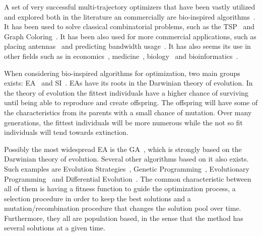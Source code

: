 A set of very successful multi-trajectory optimizers that have been vastly
utilized and explored both in the literature an commercially are bio-inspired
algorithms~\cite{olariu2005handbook}. It has been used to solve classical
combinatorial problems, such as the
\ac{TSP}~\cite{chatterjee1996genetic} and Graph Coloring~\cite{costa1995embedding}.
It has been also used for more commercial applications, such as placing
antennas~\cite{calegari1997parallel} and predicting bandwidth
usage~\cite{swaminathan1999bandwidth}. It has also seems its use in other fields
such as in economics~\cite{li1996economic}, medicine~\cite{wehrens1993hips},
biology~\cite{cotta2002inferring} and bioinformatics~\cite{cotta2009metaheuristics}.

When considering bio-inspired algorithms for optimization, two main groups
exists: \ac{EA}~\cite{back1996evolutionary} and
\ac{SI}~\cite{mavrovouniotis2017survey}. \ac{EA}s have its roots in the
Darwinian theory of evolution. In the theory of evolution the fittest
individuals have a higher chance of surviving until being able to reproduce and
create offspring. The offspring will have some of the characteristics from its
parents with a small chance of mutation. Over many
generations, the fittest individuals will be more numerous while the not so fit
individuals will tend towards extinction.

Possibly the most widespread \ac{EA} is the \ac{GA}~\cite{holland1992genetic},
which is strongly based on the Darwinian theory of evolution. Several other
algorithms based on it also exists. Such examples are
Evolution Strategies~\cite{michalewicz1996evolution},
Genetic Programming~\cite{koza1992genetic},
Evolutionary Programming~\cite{yao1996fast} and
Differential Evolution~\cite{storn1997differential}. The common characteristic
between all of them is having a fitness function to guide the optimization process,
a selection procedure in order to keep the best solutions and a mutation/recombination
procedure that changes the solution pool over time. Furthermore, they all are population
based, in the sense that the method has several solutions at a given time.


